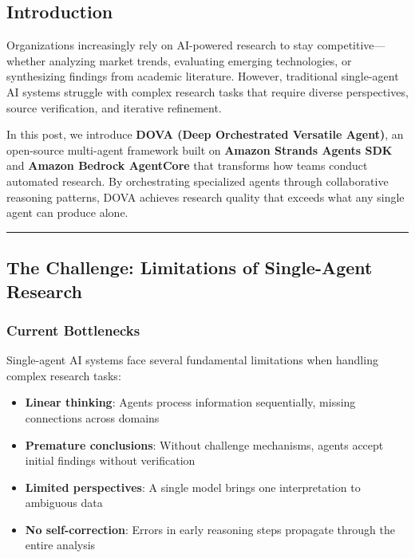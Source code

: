 \subsection{Introduction}\label{introduction}

Organizations increasingly rely on AI-powered research to stay
competitive---whether analyzing market trends, evaluating emerging
technologies, or synthesizing findings from academic literature.
However, traditional single-agent AI systems struggle with complex
research tasks that require diverse perspectives, source verification,
and iterative refinement.

In this post, we introduce \textbf{DOVA (Deep Orchestrated Versatile
Agent)}, an open-source multi-agent framework built on \textbf{Amazon
Strands Agents SDK} and \textbf{Amazon Bedrock AgentCore} that
transforms how teams conduct automated research. By orchestrating
specialized agents through collaborative reasoning patterns, DOVA
achieves research quality that exceeds what any single agent can produce
alone.

\begin{center}\rule{0.5\linewidth}{0.5pt}\end{center}

\subsection{The Challenge: Limitations of Single-Agent
Research}\label{the-challenge-limitations-of-single-agent-research}

\subsubsection{Current Bottlenecks}\label{current-bottlenecks}

Single-agent AI systems face several fundamental limitations when
handling complex research tasks:

\begin{itemize}
\tightlist
\item
  \textbf{Linear thinking}: Agents process information sequentially,
  missing connections across domains
\item
  \textbf{Premature conclusions}: Without challenge mechanisms, agents
  accept initial findings without verification
\item
  \textbf{Limited perspectives}: A single model brings one
  interpretation to ambiguous data
\item
  \textbf{No self-correction}: Errors in early reasoning steps propagate
  through the entire analysis
\end{itemize}

